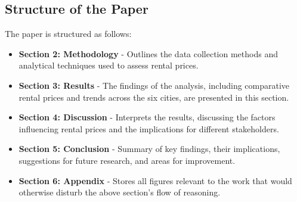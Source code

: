 \subsection{Structure of the Paper}
The paper is structured as follows:
\begin{itemize}
    \item \textbf{Section 2: Methodology} - Outlines the data collection methods and analytical techniques used to assess rental prices.
    \item \textbf{Section 3: Results} - The findings of the analysis, including comparative rental prices and trends across the six cities, are presented in this section.
    \item \textbf{Section 4: Discussion} - Interprets the results, discussing the factors influencing rental prices and the implications for different stakeholders.
    \item \textbf{Section 5: Conclusion} - Summary of key findings, their implications, suggestions for future research, and areas for improvement.
    \item \textbf{Section 6: Appendix} - Stores all figures relevant to the work that would otherwise disturb the above section's flow of reasoning.
\end{itemize}
